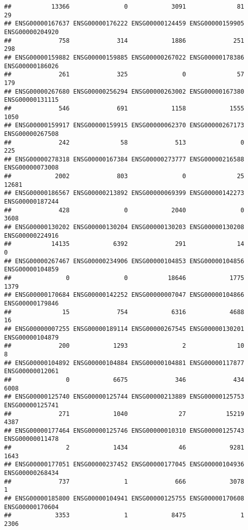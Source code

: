 \documentclass[
]{article}
\begin{document}
\begin{verbatim}
##           13366               0            3091              81              29 
## ENSG00000167637 ENSG00000176222 ENSG00000124459 ENSG00000159905 ENSG00000204920 
##             758             314            1886             251             298 
## ENSG00000159882 ENSG00000159885 ENSG00000267022 ENSG00000178386 ENSG00000186026 
##             261             325               0              57             179 
## ENSG00000267680 ENSG00000256294 ENSG00000263002 ENSG00000167380 ENSG00000131115 
##             546             691            1158            1555            1050 
## ENSG00000159917 ENSG00000159915 ENSG00000062370 ENSG00000267173 ENSG00000267508 
##             242              58             513               0             225 
## ENSG00000278318 ENSG00000167384 ENSG00000273777 ENSG00000216588 ENSG00000073008 
##            2002             803               0              25           12681 
## ENSG00000186567 ENSG00000213892 ENSG00000069399 ENSG00000142273 ENSG00000187244 
##             428               0            2040               0            3608 
## ENSG00000130202 ENSG00000130204 ENSG00000130203 ENSG00000130208 ENSG00000224916 
##           14135            6392             291              14               0 
## ENSG00000267467 ENSG00000234906 ENSG00000104853 ENSG00000104856 ENSG00000104859 
##               0               0           18646            1775            1379 
## ENSG00000170684 ENSG00000142252 ENSG00000007047 ENSG00000104866 ENSG00000179846 
##              15             754            6316            4688              16 
## ENSG00000007255 ENSG00000189114 ENSG00000267545 ENSG00000130201 ENSG00000104879 
##             200            1293               2              10               8 
## ENSG00000104892 ENSG00000104884 ENSG00000104881 ENSG00000117877 ENSG00000012061 
##               0            6675             346             434            6008 
## ENSG00000125740 ENSG00000125744 ENSG00000213889 ENSG00000125753 ENSG00000125741 
##             271            1040              27           15219            4387 
## ENSG00000177464 ENSG00000125746 ENSG00000010310 ENSG00000125743 ENSG00000011478 
##               2            1434              46            9281            1643 
## ENSG00000177051 ENSG00000237452 ENSG00000177045 ENSG00000104936 ENSG00000268434 
##             737               1             666            3078               1 
## ENSG00000185800 ENSG00000104941 ENSG00000125755 ENSG00000170608 ENSG00000170604 
##            3353               1            8475               1            2306 

\end{verbatim}
\end{document}
